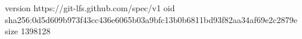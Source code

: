 version https://git-lfs.github.com/spec/v1
oid sha256:0d5d609b973f43cc436e6065b03a9bfc13b0b6811bd93f82aa34af69e2c2879e
size 1398128
